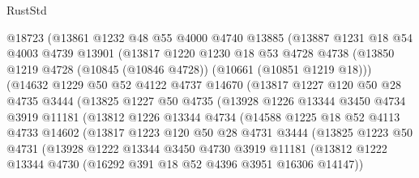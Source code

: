 \begin{lexlean}{RustStd}
\begin{coremodule}
            @18723
            (@13861
              @1232
              @48
              @55
              @4000
              @4740
              @13885
              (@13887
                @1231
                @18
                @54
                @4003
                @4739
                @13901
                (@13817
                  @1220
                  @1230
                  @18
                  @53
                  @4728
                  @4738
                  (@13850 @1219 @4728 (@10845 (@10846 @4728)) (@10661 (@10851 @1219 @18)))
                  (@14632
                    @1229
                    @50
                    @52
                    @4122
                    @4737
                    @14670
                    (@13817
                      @1227
                      @120
                      @50
                      @28
                      @4735
                      @3444
                      (@13825
                        @1227
                        @50
                        @4735
                        (@13928
                          @1226
                          @13344
                          @3450
                          @4734
                          @3919
                          @11181
                          (@13812
                            @1226
                            @13344
                            @4734
                            (@14588
                              @1225
                              @18
                              @52
                              @4113
                              @4733
                              @14602
                              (@13817
                                @1223
                                @120
                                @50
                                @28
                                @4731
                                @3444
                                (@13825
                                  @1223
                                  @50
                                  @4731
                                  (@13928
                                    @1222
                                    @13344
                                    @3450
                                    @4730
                                    @3919
                                    @11181
                                    (@13812
                                      @1222
                                      @13344
                                      @4730
                                      (@16292 @391 @18 @52 @4396 @3951 @16306 @14147))

\end{coremodule}
\end{lexlean}
